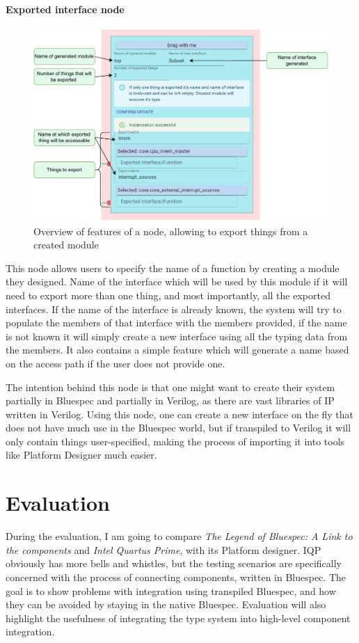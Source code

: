 \documentclass[12pt]{report}
\begin{document}
\subsubsection{Exported interface node}
\begin{figure}[h!]
\centering

\includegraphics[width=0.8\columnwidth]{pdfExports/LargeMap-ExportNode.drawio.pdf}
\caption{Overview of features of a node, allowing to export things from a created module}
\end{figure}
This node allows users to specify the name of a function by creating a module they designed. Name of the interface which will be used by this module if it will need to export more than one thing, and most importantly, all the exported interfaces. If the name of the interface is already known, the system will try to populate the members of that interface with the members provided, if the name is not known it will simply create a new interface using all the typing data from the members. It also contains a simple feature which will generate a name based on the access path if the user does not provide one. 
\par
The intention behind this node is that one might want to create their system partially in Bluespec and partially in Verilog, as there are vast libraries of IP written in Verilog. Using this node, one can create a new interface on the fly that does not have much use in the Bluespec world, but if transpiled to Verilog it will only contain things user-specified, making the process of importing it into tools like Platform Designer much easier. 

\chapter{Evaluation} 
During the evaluation, I am going to compare \emph{The Legend of Bluespec: A Link to the components} and \emph{Intel Quartus Prime}, with its Platform designer. 
IQP obviously has more bells and whistles, but the testing scenarios are specifically concerned with the process of connecting components, written in Bluespec. 
The goal is to show problems with integration using transpiled Bluespec, and how they can be avoided by staying in the native Bluespec. 
Evaluation will also highlight the usefulness of integrating the type system into high-level component integration. 
\end{document}
